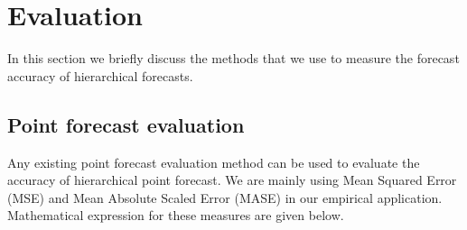 \documentclass[graybox]{svmult}
\begin{document}



\section{Evaluation}

In this section we briefly discuss the methods that we use to measure the forecast accuracy of hierarchical forecasts.

\subsection{Point forecast evaluation}

Any existing point forecast evaluation method can be used to evaluate the accuracy of hierarchical point forecast. We are mainly using Mean Squared Error (MSE) and Mean Absolute Scaled Error (MASE) in our empirical application. Mathematical expression for these measures are given below.
\end{document}
